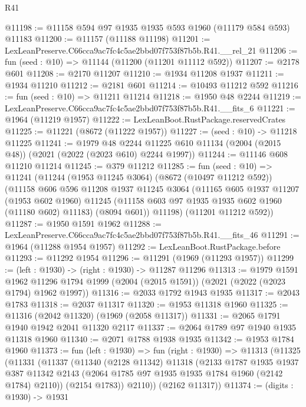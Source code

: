 \begin{lexlean}{R41}
\begin{coremodule}
@11198 := @11158 @594 @97 @1935 @1935 @593 @1960 (@11179 @584 @593) @11183
@11200 := @11157 (@11188 @11198)
@11201 := LexLeanPreserve.C66cca9ac7fc4c5ae2bbd07f753f87b5b.R41.__rel_21
@11206 := fun (seed : @10) => @11144 (@11200 (@11201 @11112 @592))
@11207 := @2178 @601
@11208 := @2170 @11207
@11210 := @1934 @11208 @1937
@11211 := @1934 @11210
@11212 := @2181 @601
@11214 := @10493 @11212 @592
@11216 := fun (seed : @10) => @11211 @11214
@11218 := @1950 @48 @2244
@11219 := LexLeanPreserve.C66cca9ac7fc4c5ae2bbd07f753f87b5b.R41.__fits_6
@11221 := @1964 (@11219 @1957)
@11222 := LexLeanBoot.RustPackage.reservedCrates
@11225 := @11221 (@8672 (@11222 @1957))
@11227 := (seed : @10) -> @11218 @11225
@11241 := @1979
    @48
    @2244
    @11225
    @610
    @11134
    (@2004 (@2015 @48))
    (@2021 (@2022 (@2023 @610) @2244 @1997))
@11244 := @11146 @608 @11210 @11214
@11245 := @379 @11212
@11285 := fun (seed : @10) =>
  @11241
    (@11244
      (@1953 @11245 @3064)
      (@8672 (@10497 @11212 @592))
      (@11158
        @606
        @596
        @11208
        @1937
        @11245
        @3064
        (@11165
          @605
          @1937
          @11207
          (@1953 @602 @1960)
          @11245
          (@11158 @603 @97 @1935 @1935 @602 @1960 (@11180 @602) @11183)
          (@8094 @601))
        @11198)
      (@11201 @11212 @592))
@11287 := @1950 @1591 @1962
@11288 := LexLeanPreserve.C66cca9ac7fc4c5ae2bbd07f753f87b5b.R41.__fits_46
@11291 := @1964 (@11288 @1954 @1957)
@11292 := LexLeanBoot.RustPackage.before
@11293 := @11292 @1954
@11296 := @11291 (@1969 (@11293 @1957))
@11299 := (left : @1930) -> (right : @1930) -> @11287 @11296
@11313 := @1979
    @1591
    @1962
    @11296
    @1794
    @1999
    (@2004 (@2015 @1591))
    (@2021 (@2022 (@2023 @1794) @1962 @1997))
@11316 := @2033 @1792 @1943 @1935
@11317 := @2043 @1783
@11318 := @2037 @11317
@11320 := @1953 @11318 @1960
@11325 := @11316 (@2042 @11320) (@1969 (@2058 @11317))
@11331 := @2065 @1791 @1940 @1942 @2041 @11320 @2117
@11337 := @2064 @1789 @97 @1940 @1935 @11318 @1960
@11340 := @2071 @1788 @1938 @1935
@11342 := @1953 @1784 @1960
@11373 := fun (left : @1930) =>
  fun (right : @1930) =>
  @11313
    (@11325
      (@11331
        (@11337
          (@11340
            (@2128 @11342)
            @11318
            (@2133
              @1787
              @1935
              @1937
              @387
              @11342
              @2143
              (@2064 @1785 @97 @1935 @1935 @1784 @1960 (@2142 @1784) @2110))
            (@2154 @1783))
          @2110))
      (@2162 @11317))
@11374 := (digits : @1930) -> @1931

\end{coremodule}
\end{lexlean}
